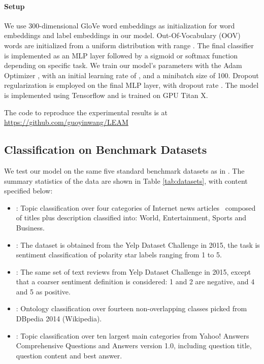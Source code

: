 \documentclass[11pt,a4paper]{article}
\begin{document}
\paragraph{Setup} We use 300-dimensional GloVe word embeddings \citet{pennington2014glove} as initialization for word embeddings and label embeddings in our model. Out-Of-Vocabulary (OOV) words are initialized from a uniform distribution with range . The final classifier is implemented as an MLP layer followed by a sigmoid or softmax function depending on specific task. We train our model's parameters with the Adam Optimizer \citep{kingma2014adam}, with an initial learning rate of , and a minibatch size of 100. Dropout regularization \citep{srivastava2014dropout} is employed on the final MLP layer, with dropout rate . The model is implemented using Tensorflow and is trained  on GPU Titan X. 

The code to reproduce the experimental results is at~
{\small  \url{https://github.com/guoyinwang/LEAM}}
\subsection{Classification on Benchmark Datasets}
We test our model on the same five standard benchmark datasets as in \citep{zhang2015character}. The summary statistics of the data are shown in Table \ref{tab:datasets}, with content specified below:
\begin{itemize}
	\item : Topic classification over four categories of Internet news articles~\citep{del2005ranking} composed of titles plus description classified into: World, Entertainment, Sports and Business. 
\item : The dataset is obtained from the Yelp Dataset Challenge in 2015, the task is sentiment classification of polarity star labels ranging from 1 to 5.
\item : The same set of text reviews from Yelp Dataset Challenge in 2015, except that a coarser sentiment definition is considered: 1 and 2 are negative, and 4 and 5 as positive. 
\item : Ontology classification over fourteen non-overlapping classes picked from DBpedia 2014 (Wikipedia).
\item 
	: Topic classification over ten largest main categories from Yahoo! Answers Comprehensive Questions and Answers version 1.0, including question title, question content and best answer. 
\end{itemize}
\end{document}
